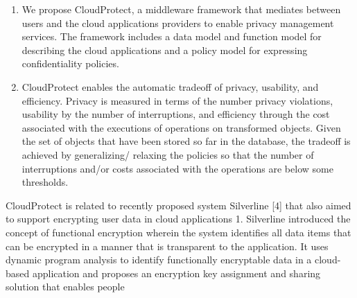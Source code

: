 \documentclass[11pt,onecolumn]{article}
\begin{document}
\begin{enumerate}
\item
 We propose CloudProtect, a middleware framework that mediates between users
and the cloud applications providers to enable privacy management services.
The framework includes a data model and function model for describing the
cloud applications and a policy model for expressing confidentiality policies.

\item
 CloudProtect enables the automatic tradeoff of privacy, usability, and efficiency.
Privacy is measured in terms of the number privacy violations, usability by
the number of interruptions, and efficiency through the cost associated with
the executions of operations on transformed objects. Given the set of objects
that have been stored so far in the database, the tradeoff is achieved by generalizing/
relaxing the policies so that the number of interruptions and/or costs
associated with the operations are below some thresholds.

\end{enumerate}



CloudProtect is related to recently proposed system Silverline [4] that also aimed
to support encrypting user data in cloud applications 1. Silverline introduced the
concept of functional encryption wherein the system identifies all data items that can
be encrypted in a manner that is transparent to the application. It uses dynamic program
analysis to identify functionally encryptable data in a cloud-based application
and proposes an encryption key assignment and sharing solution that enables people
\end{document}
